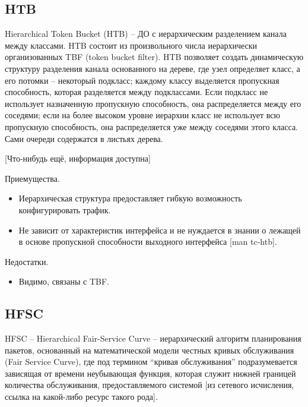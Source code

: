 	\subsection{HTB}

        Hierarchical Token Bucket (HTB) -- ДО с иерархическим разделением канала между классами. HTB
        состоит из произвольного числа иерархически организованных TBF (token bucket filter). HTB
        позволяет создать динамическую структуру разделения канала основанного
        на дереве, где узел определяет класс, а его потомки -- некоторый подкласс;
        каждому классу выделяется пропускная способность, которая разделяется между
        подклассами. Если подкласс не использует назначенную пропускную способность,
        она распределяется между его соседями; если на более высоком уровне иерархии
        класс не использует всю пропускную способность, она распределяется уже между
        соседями этого класса. Сами очереди содержатся в листьях дерева.

		[Что-нибудь ещё, информация доступна]

		Приемущества.
		\begin{itemize}
			\item Иерархическая структура предоставляет гибкую возможность конфигурировать трафик.
            \item Не зависит от характеристик интерфейса и не нуждается в знании о лежащей в основе пропускной способности выходного интерфейса [man tc-htb].
		\end{itemize}

		Недостатки.
		\begin{itemize}
			\item Видимо, связаны с TBF.
		\end{itemize}

	\subsection{HFSC}



        HFSC -- Hierarchical Fair-Service Curve -- иерархический алгоритм планирования пакетов,
        основанный на математической модели честных кривых обслуживания (Fair Service Curve),
        где под термином “кривая обслуживания” подразумевается зависящая от времени
        неубывающая функция, которая служит нижней границей количества обслуживания,
        предоставляемого системой [из сетевого исчисления, ссылка на какой-либо ресурс
        такого рода].

